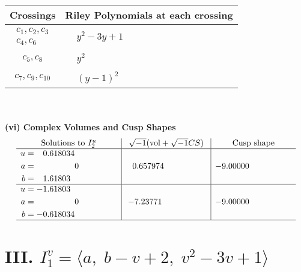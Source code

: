 \documentclass[1p]{elsarticle_modified}
\theoremstyle{definition}
\newcommand{\I}{\sqrt{-1}}
\begin{document}
\begin{tabular}{m{50pt}|m{274pt}}
Crossings & \hspace{64pt}Riley Polynomials at each crossing \\
\hline $$\begin{aligned}c_{1},c_{2},c_{3}\\c_{4},c_{6}\end{aligned}$$&$\begin{aligned}
&y^2-3 y+1
\end{aligned}$\\
\hline $$\begin{aligned}c_{5},c_{8}\end{aligned}$$&$\begin{aligned}
&y^2
\end{aligned}$\\
\hline $$\begin{aligned}c_{7},c_{9},c_{10}\end{aligned}$$&$\begin{aligned}
&(y-1)^2
\end{aligned}$\\
\hline
\end{tabular}\\~\\
\newpage\flushleft \textbf{(vi) Complex Volumes and Cusp Shapes}
$$\begin{array}{c|c|c}  
\text{Solutions to }I^u_{2}& \I (\text{vol} + \sqrt{-1}CS) & \text{Cusp shape}\\
 \hline 
\begin{aligned}
u &= \phantom{-}0.618034\phantom{ +0.000000I} \\
a &= \phantom{-0.000000 } 0 \\
b &= \phantom{-}1.61803\phantom{ +0.000000I}\end{aligned}
 & \phantom{-}0.657974\phantom{ +0.000000I} & -9.00000\phantom{ +0.000000I} \\ \hline\begin{aligned}
u &= -1.61803\phantom{ +0.000000I} \\
a &= \phantom{-0.000000 } 0 \\
b &= -0.618034\phantom{ +0.000000I}\end{aligned}
 & -7.23771\phantom{ +0.000000I} & -9.00000\phantom{ +0.000000I}\\
 \hline 
 \end{array}$$\newpage\newpage\renewcommand{\arraystretch}{1}
\centering \section*{III. $I^v_{1}= \langle a,\;b- v+2,\;v^2-3 v+1 \rangle$}
\end{document}
